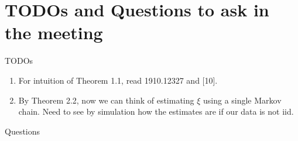 \chapter{TODOs and Questions to ask in the meeting}

TODOs
\begin{enumerate}
    \item For intuition of Theorem 1.1, read 1910.12327 and [10].
    \item By Theorem 2.2, now we can think of estimating $\xi$ using a single Markov chain. Need to see by simulation how the estimates are if our data is not iid.
\end{enumerate}

Questions
